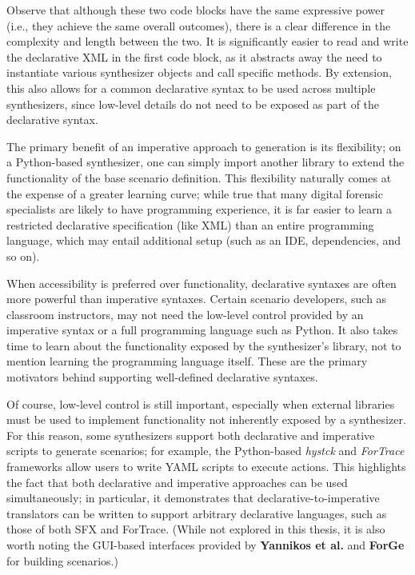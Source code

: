 \documentclass[letterpaper,12pt]{report}
\begin{document}
Observe that although these two code blocks have the same expressive
power (i.e., they achieve the same overall outcomes), there is a clear
difference in the complexity and length between the two. It is
significantly easier to read and write the declarative XML in the first
code block, as it abstracts away the need to instantiate various
synthesizer objects and call specific methods. By extension, this also
allows for a common declarative syntax to be used across multiple
synthesizers, since low-level details do not need to be exposed as part
of the declarative syntax.

The primary benefit of an imperative approach to generation is its
flexibility; on a Python-based synthesizer, one can simply import
another library to extend the functionality of the base scenario
definition. This flexibility naturally comes at the expense of a greater
learning curve; while true that many digital forensic specialists are
likely to have programming experience, it is far easier to learn a
restricted declarative specification (like XML) than an entire
programming language, which may entail additional setup (such as an IDE,
dependencies, and so on).

When accessibility is preferred over functionality, declarative syntaxes
are often more powerful than imperative syntaxes. Certain scenario
developers, such as classroom instructors, may not need the low-level
control provided by an imperative syntax or a full programming language
such as Python. It also takes time to learn about the functionality
exposed by the synthesizer's library, not to mention learning the
programming language itself. These are the primary motivators behind
supporting well-defined declarative syntaxes.

Of course, low-level control is still important, especially when
external libraries must be used to implement functionality not
inherently exposed by a synthesizer. For this reason, some synthesizers
support both declarative and imperative scripts to generate scenarios;
for example, the Python-based \emph{hystck} and \emph{ForTrace}
frameworks allow users to write YAML scripts to execute actions. This
highlights the fact that both declarative and imperative approaches can
be used simultaneously; in particular, it demonstrates that
declarative-to-imperative translators can be written to support
arbitrary declarative languages, such as those of both SFX and ForTrace.
(While not explored in this thesis, it is also worth noting the
GUI-based interfaces provided by \textbf{Yannikos et al.} and
\textbf{ForGe} for building scenarios.)
\end{document}
